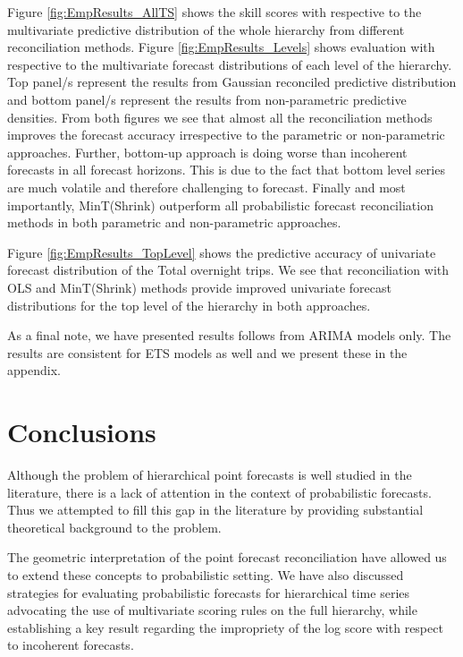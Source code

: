 \documentclass[12pt]{article}
\theoremstyle{definition}
\begin{document}
Figure \ref{fig:EmpResults_AllTS} shows the skill scores with respective to the multivariate predictive distribution of the whole hierarchy from different reconciliation methods. Figure \ref{fig:EmpResults_Levels} shows evaluation with respective to the multivariate forecast distributions of each level of the hierarchy. Top panel/s represent the results from Gaussian reconciled predictive distribution and bottom panel/s represent the results from non-parametric predictive densities. From both figures we see that almost all the reconciliation methods improves the forecast accuracy irrespective to the parametric or non-parametric approaches. Further, bottom-up approach is doing worse than incoherent forecasts in all forecast horizons. This is due to the fact that bottom level series are much volatile and therefore challenging to forecast. Finally and most importantly, MinT(Shrink) outperform all probabilistic forecast reconciliation methods in both parametric and non-parametric approaches. 

Figure \ref{fig:EmpResults_TopLevel} shows the predictive accuracy of univariate forecast distribution of the Total overnight trips. We see that reconciliation with OLS and MinT(Shrink) methods provide improved univariate forecast distributions for the top level of the hierarchy in both approaches. 

As a final note, we have presented results follows from ARIMA models only. The results are consistent for ETS models as well and we present these in the appendix.




\section{Conclusions}\label{sec:conclusions}

Although the problem of hierarchical point forecasts is well studied in the literature, there is a lack of attention in the context of probabilistic forecasts. Thus we attempted to fill this gap in the literature by providing substantial theoretical background to the problem.

The geometric interpretation of the point forecast reconciliation have allowed us to extend these concepts to probabilistic setting. We have also discussed strategies for evaluating probabilistic forecasts for hierarchical time series advocating the use of multivariate scoring rules on the full hierarchy, while establishing a key result regarding the impropriety of the log score with respect to incoherent forecasts. 
\end{document}
